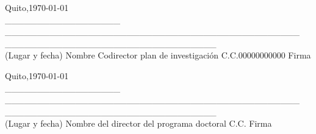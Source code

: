 \documentclass[a4paper,12pt]{article}
\begin{document}
		\vspace{1cm}
	
	\begin{flushleft}
		Quito,\today\\
		\_\_\_\_\_\_\_\_\_\_\_\_\_\_\_\_\_\_\hspace{0.1cm} \_\_\_\_\_\_\_\_\_\_\_\_\_\_\_\_\_\_\_\_\_\_\_\_\_\_\_\_\_\_\_\_\_\_\_\_\_\_\_\_\_\_\_\_\_\_  \hspace{0.3cm}\_\_\_\_\_\_\_\_\_\_\_\_\_\_\_\_\_\hspace{0.1cm}\_\_\_\_\_\_\_\_\_\_\_\_\_\_\_\_\\
		(Lugar y fecha) \hspace{0.0cm} Nombre Codirector plan de investigación \hspace{0.1cm} C.C.\hspace{0.05cm}00000000000 \hspace{0.1cm} Firma \\
	\end{flushleft}
	
	\vspace{1cm}
	
	\begin{flushleft}
 	Quito,\today\\
 	\_\_\_\_\_\_\_\_\_\_\_\_\_\_\_\_\_\_\hspace{0.1cm} \_\_\_\_\_\_\_\_\_\_\_\_\_\_\_\_\_\_\_\_\_\_\_\_\_\_\_\_\_\_\_\_\_\_\_\_\_\_\_\_\_\_\_\_\_\_  \hspace{0.3cm}\_\_\_\_\_\_\_\_\_\_\_\_\_\_\_\_\_\hspace{0.1cm}\_\_\_\_\_\_\_\_\_\_\_\_\_\_\_\_\\
		(Lugar y fecha) \hspace{0.0cm} Nombre del director del programa doctoral \hspace{1.3cm} C.C.\hspace{1cm} \hspace{0.1cm} Firma \\
	\end{flushleft}
	
%		
%	
	
\end{document}
